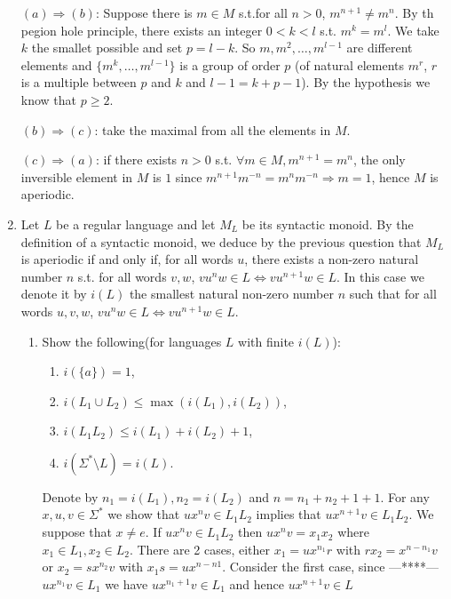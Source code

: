 \documentclass[a4paper,11pt]{exam}
\begin{document}
\begin{questions}
\begin{enumerate}[resume]
      \begin{solution}
        $(a) \Rightarrow (b)$: Suppose there is $m \in M$ s.t.for all $n>0$, $m^{n+1} \neq m^n$.
        By th pegion hole principle, there exists an integer $0<k<l$ s.t. $m^k = m^l$. We take $k$ the smallet possible and set $p=l-k$. So $m,m^2, \dots, m^{l-1}$ are different elements and $\{m^k, \dots, m^{l-1}\}$ is a group of order $p$ (of natural elements $m^r$, $r$ is a multiple between $p$ and $k$ and $l-1=k+p-1$).
        By the hypothesis we know that $p \geq 2$.

        $(b) \Rightarrow (c)$: take the maximal from all the elements in $M$.

        $(c) \Rightarrow (a)$: if there exists $n>0$ s.t.
        $\forall m \in M, m^{n+1} = m^n$, the only inversible element in $M$ is $1$ since $m^{n+1}m^{-n} = m^nm^{-n} \Rightarrow m = 1$,  hence $M$ is aperiodic.
      \end{solution}

    \item Let $L$ be a regular language and let $M_L$ be its syntactic monoid.
      By the definition of a syntactic monoid, we deduce by the previous question that $M_L$ is aperiodic if and only if, for all words $u$, there exists a non-zero natural number $n$ s.t. for all words $v,w$, $vu^nw \in L \Leftrightarrow vu^{n+1}w \in L$.
      In this case we denote it by $i(L)$ the smallest natural non-zero number $n$ such that for all words $u,v,w$, $vu^nw \in L \Leftrightarrow vu^{n+1}w \in L$. 
      \begin{enumerate}
        \item Show the following(for languages $L$ with finite $i(L)$):
          \begin{enumerate}
            \item $i(\{a\}) = 1$,
            \item $i(L_1\cup L_2) \leq \max(i(L_1), i(L_2))$,
            \item $i(L_1L_2) \leq i(L_1)+ i(L_2)+1$,
            \item $i(\Sigma^* \setminus L) = i(L)$.
          \end{enumerate}
      \begin{solution}
      	Denote by $n_1=i(L_1), n_2=i(L_2)$ and $n=n_1+n_2+1+1$.
      	For any $x,u,v\in \Sigma^* $ we show that $ux^nv\in L_1L_2$ implies that  $ux^{n+1}v\in L_1L_2$. 
      	We suppose that $x\neq e$. If $ux^nv\in L_1L_2$ then $ux^nv = x_1x_2$ where $x_1\in L_1, x_2\in L_2$. 
      	There are 2 cases, either $x_1 = ux^{n_1}r$ with $rx_2=x^{n-n_1}v$ or $x_2=sx^{n_2}v$ with $x_1s=ux^{n-n1}$. Consider the first case, since ---****--- $ux^{n_1}v\in L_1$ we have $ux^{n_1+1}v\in L_1$ and hence $ux^{n+1}v\in L$ 
      \end{solution}
      

\end{enumerate}
\end{enumerate}
\end{questions}
\end{document}

